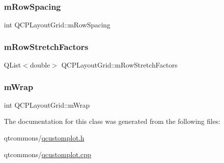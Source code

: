 \mbox{\label{class_q_c_p_layout_grid_a8b67f183f4645739cc4c794d75843b40}} 
\subsubsection{\texorpdfstring{mRowSpacing}{mRowSpacing}}
{\footnotesize\ttfamily int Q\+C\+P\+Layout\+Grid\+::m\+Row\+Spacing\hspace{0.3cm}{\ttfamily [protected]}}

\mbox{\label{class_q_c_p_layout_grid_a36c85a7eaf342680fb9b8a4977486f16}} 
\subsubsection{\texorpdfstring{mRowStretchFactors}{mRowStretchFactors}}
{\footnotesize\ttfamily Q\+List$<$double$>$ Q\+C\+P\+Layout\+Grid\+::m\+Row\+Stretch\+Factors\hspace{0.3cm}{\ttfamily [protected]}}

\mbox{\label{class_q_c_p_layout_grid_a17d90c289139847f68cca9e75d64b0fd}} 
\subsubsection{\texorpdfstring{mWrap}{mWrap}}
{\footnotesize\ttfamily int Q\+C\+P\+Layout\+Grid\+::m\+Wrap\hspace{0.3cm}{\ttfamily [protected]}}



The documentation for this class was generated from the following files\+:\begin{DoxyCompactItemize}
\item 
qtcommons/\mbox{\hyperlink{qcustomplot_8h}{qcustomplot.\+h}}\item 
qtcommons/\mbox{\hyperlink{qcustomplot_8cpp}{qcustomplot.\+cpp}}\end{DoxyCompactItemize}
